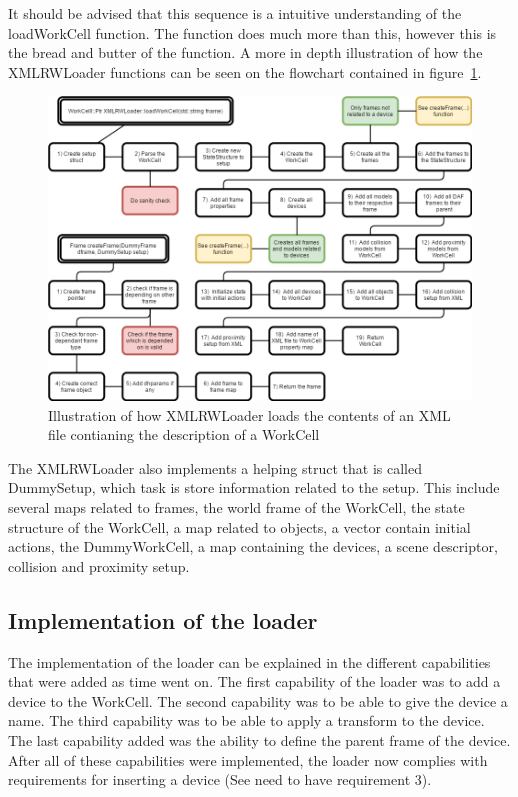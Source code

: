 It should be advised that this sequence is a intuitive understanding of the loadWorkCell function. The function does much more than this, however this is the bread and butter of the function. A more in depth illustration of how the XMLRWLoader functions can be seen on the flowchart contained in figure~\ref{fig:ComplexLoadWC}.

\begin{figure}[h]
	\centering
	\includegraphics[scale=0.55]{Figures/ComplexLoadWC.png}
	\caption{Illustration of how XMLRWLoader loads the contents of an XML file contianing the description of a WorkCell}
	\label{fig:ComplexLoadWC}
\end{figure}

The XMLRWLoader also implements a helping struct that is called DummySetup, which task is store information related to the setup. This include several maps related to frames, the world frame of the WorkCell, the state structure of the WorkCell, a map related to objects, a vector contain initial actions, the DummyWorkCell, a map containing the devices, a scene descriptor, collision and proximity setup.

\subsection{Implementation of the loader}
The implementation of the loader can be explained in the different capabilities that were added as time went on. The first capability of the loader was to add a device to the WorkCell. The second capability was to be able to give the device a name. The third capability was to be able to apply a transform to the device. The last capability added was the ability to define the parent frame of the device. After all of these capabilities were implemented, the loader now complies with requirements for inserting a device (See need to have requirement 3).

